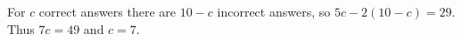 For $c$ correct answers there are $10-c$ incorrect answers, so $5c-2(10-c)=29$. Thus $7c=49$ and $\boxed{c=7}$.
